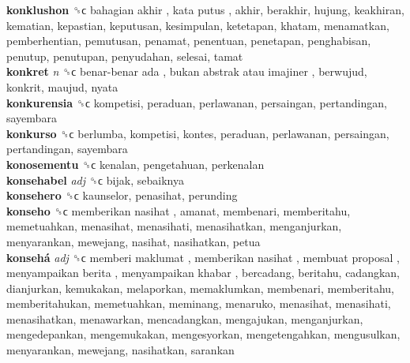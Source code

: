 \textbf{konklushon} ␝ϲ   bahagian akhir ,  kata putus , akhir, berakhir, hujung, keakhiran, kematian, kepastian, keputusan, kesimpulan, ketetapan, khatam, menamatkan, pemberhentian, pemutusan, penamat, penentuan, penetapan, penghabisan, penutup, penutupan, penyudahan, selesai, tamat  \\
\textbf{konkret} \emph{n}  ␝ϲ   benar-benar ada ,  bukan abstrak atau imajiner , berwujud, konkrit, maujud, nyata  \\
\textbf{konkurensia} ␝ϲ  kompetisi, peraduan, perlawanan, persaingan, pertandingan, sayembara  \\
\textbf{konkurso} ␝ϲ  berlumba, kompetisi, kontes, peraduan, perlawanan, persaingan, pertandingan, sayembara  \\
\textbf{konosementu} ␝ϲ  kenalan, pengetahuan, perkenalan  \\
\textbf{konsehabel} \emph{adj}  ␝ϲ  bijak, sebaiknya  \\
\textbf{konsehero} ␝ϲ  kaunselor, penasihat, perunding  \\
\textbf{konseho} ␝ϲ   memberikan nasihat , amanat, membenari, memberitahu, memetuahkan, menasihat, menasihati, menasihatkan, menganjurkan, menyarankan, mewejang, nasihat, nasihatkan, petua  \\
\textbf{konsehá} \emph{adj}  ␝ϲ   memberi maklumat ,  memberikan nasihat ,  membuat proposal ,  menyampaikan berita ,  menyampaikan khabar , bercadang, beritahu, cadangkan, dianjurkan, kemukakan, melaporkan, memaklumkan, membenari, memberitahu, memberitahukan, memetuahkan, meminang, menaruko, menasihat, menasihati, menasihatkan, menawarkan, mencadangkan, mengajukan, menganjurkan, mengedepankan, mengemukakan, mengesyorkan, mengetengahkan, mengusulkan, menyarankan, mewejang, nasihatkan, sarankan  \\
